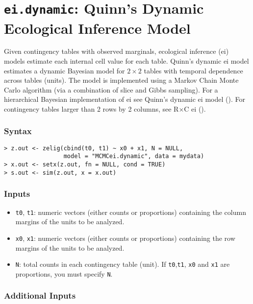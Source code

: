 \section{{\tt ei.dynamic}: Quinn's Dynamic Ecological Inference
Model}\label{ei.dynamic}

Given contingency tables with observed marginals, ecological inference
({\sc ei}) models estimate each internal cell value for each table.
Quinn's dynamic {\sc ei} model estimates a dynamic Bayesian model for
$2 \times 2$ tables with temporal dependence across tables (units).
The model is implemented using a Markov Chain Monte Carlo algorithm
(via a combination of slice and Gibbs sampling).  
For a hierarchical Bayesian implementation of {\sc ei} see Quinn's
dynamic {\sc ei} model (). For contingency tables larger than
2 rows by 2 columns, see R$\times$C {\sc ei} (). 

\subsubsection{Syntax}

\begin{verbatim}
> z.out <- zelig(cbind(t0, t1) ~ x0 + x1, N = NULL, 
                 model = "MCMCei.dynamic", data = mydata)
> x.out <- setx(z.out, fn = NULL, cond = TRUE)
> s.out <- sim(z.out, x = x.out)
\end{verbatim}

\subsubsection{Inputs}
\begin{itemize}
\item \texttt{t0}, {\tt t1}: numeric vectors (either counts or
proportions) containing the column margins of the units to be
analyzed.

\item \texttt{x0}, {\tt x1}: numeric vectors (either counts or
proportions) containing the row margins of the units to be
analyzed.

\item \texttt{N}: total counts in each contingency table (unit).  If
\texttt{t0},\texttt{t1}, \texttt{x0} and \texttt{x1} are proportions,
you must specify \texttt{N}.

\end{itemize}

\subsubsection{Additional Inputs}

